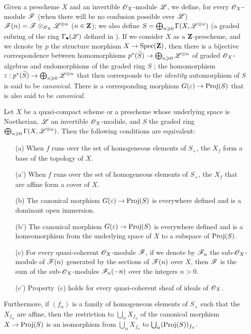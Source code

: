\begin{env}[4.5.1]
\label{II.4.5.1}
Given a prescheme $X$ and an invertible $\mathscr{O}_X$-module $\mathscr{L}$, we define, for every $\mathscr{O}_X$-module $\mathscr{F}$ (when there will be no confusion possible over $\mathscr{L}$) $\mathscr{F}(n)=\mathscr{F}\otimes_{\mathscr{O}_X}\mathscr{L}^{\otimes n}$ ($n\in\mathbf{Z}$);
we also define $S=\bigoplus_{n\geqslant0}\Gamma(X,\mathscr{L}^{\otimes n})$ (a graded subring of the ring $\Gamma_\bullet(\mathscr{L})$ defined in ).
If we consider $X$ as a $\mathbf{Z}$-prescheme, and we denote by $p$ the structure morphism $X\to\Spec(\bb{Z})$, then there is a bijective correspondence between homomorphisms $p^*(\widetilde{S})\to\bigoplus_{n\geq0}\sh{L}^{\otimes n}$ of graded $\mathscr{O}_X$-algebras and endomorphisms of the graded ring $S$ ;
the homomorphism $\varepsilon:p^*(\widetilde{S})\to\bigoplus_{n\geq0}\sh{L}^{\otimes n}$ that then corresponds to the \emph{identity} automorphism of $S$ is said to be \emph{canonical}.
There is a corresponding  morphism $G(\varepsilon)\to\Proj(S)$ that is also said to be \emph{canonical}.
\end{env}

\begin{theorem}[4.5.2]
\label{II.4.5.2}
Let $X$ be a quasi-compact scheme or a prescheme whose underlying space is Noetherian, $\mathscr{L}$ an invertible $\mathscr{O}_X$-module, and $S$ the graded ring $\bigoplus_{n\geqslant0}\Gamma(X,\mathscr{L}^{\otimes n})$.
Then the following conditions are equivalent:
\begin{enumerate}
  \item[\rm{(a)}] When $f$ runs over the set of homogeneous elements of $S_+$, the $X_f$ form a base of the topology of $X$.
  \item[\rm{(a')}] When $f$ runs over the set of homogeneous elements of $S_+$, the $X_f$ that are affine form a cover of $X$.
  \item[\rm{(b)}] The canonical morphism $G(\varepsilon)\to\Proj(S)$  is everywhere defined and is a dominant open immersion.
  \item[\rm{(b')}] The canonical morphism $G(\varepsilon)\to\Proj(S)$ is everywhere defined and is a homeomorphism from the underlying space of $X$ to a subspace of $\operatorname{Proj}(S)$.
  \item[\rm{(c)}] For every quasi-coherent $\mathscr{O}_X$-module $\mathscr{F}$, if we denote by $\mathscr{F}_n$ the sub-$\mathscr{O}_X$-module of $\mathscr{F}(n)$ generated by the sections of $\mathscr{F}(n)$ over $X$, then $\mathscr{F}$ is the sum of the sub-$\mathscr{O}_X$-modules $\mathscr{F}_n(-n)$ over the integers $n>0$.
  \item[\rm{(c')}] Property~\rm{(c)} holds for every quasi-coherent sheaf of ideals of $\mathscr{O}_X$.
\end{enumerate}

Furthermore, if $(f_\alpha)$ is a family of homogeneous elements of $S_+$ such that the $X_{f_\alpha}$ are affine, then the restriction to $\bigcup_\alpha X_{f_\alpha}$ of the canonical morphism $X\to\Proj(S)$ is an isomorphism from $\bigcup_\alpha X_{f_\alpha}$ to $\bigcup_\alpha(\operatorname{Proj}(S))_{f_\alpha}$.
\end{theorem}

